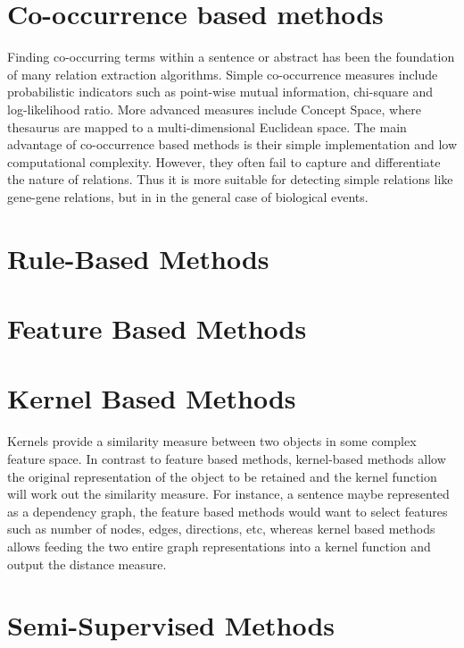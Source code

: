 \section{Co-occurrence based methods}%
Finding co-occurring terms within a sentence or abstract has been the foundation of many relation extraction algorithms\cite{chaussabel2002mining,becker2003pubmatrix,tanabe1999medminer,stapley2000biobibliometrics,jenssen2001literature,wren2004knowledge}. Simple co-occurrence measures include probabilistic indicators such as point-wise mutual information, chi-square and log-likelihood ratio. More advanced measures include Concept Space, where thesaurus are mapped to a multi-dimensional Euclidean space\cite{leroy2005genescene, van2004constructing}. The main advantage of co-occurrence based methods is their simple implementation and low computational complexity. However, they often fail to capture and differentiate the nature of relations. Thus it is more suitable for detecting simple relations like gene-gene relations, but in in the general case of biological events. 
\section{Rule-Based Methods}

\section{Feature Based Methods}  %
\label{section1.3}

\section{Kernel Based Methods} 
Kernels provide a similarity measure between two objects in some complex feature space. In contrast to feature based methods, kernel-based methods allow the original representation of the object to be retained and the kernel function will work out the similarity measure. For instance, a sentence maybe represented as a dependency graph, the feature based methods would want to select features such as number of nodes, edges, directions, etc, whereas kernel based methods allows feeding the two entire graph representations into a kernel function and output the distance measure.
\section{Semi-Supervised Methods}



